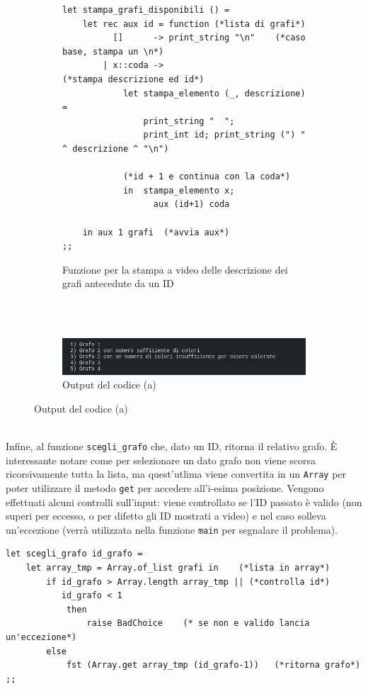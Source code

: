 \begin{figure}[H]
	\begin{subfigure}{\textwidth}

\begin{lstlisting}[style=caml]
let stampa_grafi_disponibili () = 
	let rec aux id = function (*lista di grafi*)
		  []      -> print_string "\n"    (*caso base, stampa un \n*)
		| x::coda ->                      (*stampa descrizione ed id*)
			let stampa_elemento (_, descrizione) = 
				print_string "  "; 
				print_int id; print_string (") " ^ descrizione ^ "\n")

			(*id + 1 e continua con la coda*)
			in  stampa_elemento x;    
				  aux (id+1) coda     

	in aux 1 grafi  (*avvia aux*)
;;
\end{lstlisting}
		\caption{Funzione per la stampa a video delle descrizione dei grafi antecedute da un ID}
	\end{subfigure}
\ \\
\ \\
	\begin{subfigure}{\textwidth}
		\includegraphics[width=\textwidth]{img/descrizione_grafi.png}
		\caption{Output del codice (a)}
	\end{subfigure}
\end{figure}

\ \\
Infine, al funzione \lstinline[style=cmd]|scegli_grafo| che, dato un ID, ritorna il relativo grafo. \`{E} interessante notare come per selezionare un dato grafo non viene scorsa ricorsivamente tutta la lista, ma quest'utlima viene convertita in un \lstinline[style=cmd]|Array| per poter utilizzare il metodo \lstinline[style=cmd]|get| per accedere all'i-esima posizione. Vengono effettuati alcuni controlli sull'input: viene controllato se l'ID passato è valido (non superi per eccesso, o per difetto gli ID mostrati a video) e nel caso solleva un'eccezione (verrà utilizzata nella funzione \lstinline[style=cmd]|main| per segnalare il problema). %

\begin{lstlisting}[style=caml, caption={Funzione che ritorna il grafo selezionato}]
let scegli_grafo id_grafo =
	let array_tmp = Array.of_list grafi in    (*lista in array*)
		if id_grafo > Array.length array_tmp || (*controlla id*)
		   id_grafo < 1  
			then 
				raise BadChoice    (* se non e valido lancia un'eccezione*)
		else
			fst (Array.get array_tmp (id_grafo-1))   (*ritorna grafo*)
;; 
\end{lstlisting}

